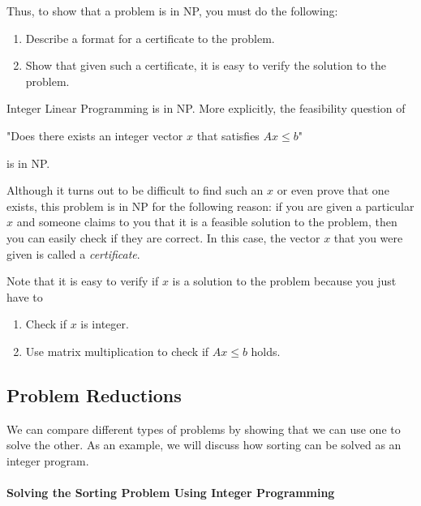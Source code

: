 Thus, to show that a problem is in NP, you must do the following:
\begin{enumerate}
\item Describe a format for a certificate to the problem.
\item Show that given such a certificate, it is easy to verify the solution to the problem.
\end{enumerate}
\begin{example}{}{}
Integer Linear Programming is in NP.  More explicitly, the feasibility question of
\begin{center}
"Does there exists an integer vector $x$ that satisfies $Ax\leq b$"
\end{center}
is in NP.  

Although it turns out to be difficult to find such an $x$ or even prove that one exists, this problem is in NP for the following reason:  if you are given a particular $x$ and someone claims to you that it is a feasible solution to the problem, then you can easily check if they are correct.  
In this case, the vector $x$ that you were given is called a \emph{certificate}.

Note that it is easy to verify if $x$ is a solution to the problem because you just have to 
\begin{enumerate}
\item Check if $x$ is integer.
\item Use matrix multiplication to check if $Ax \leq b$ holds.
\end{enumerate}
\end{example}
\subsection{Problem Reductions}

We can compare different types of problems by showing that we can use one to solve the other.  As an example, we will discuss how sorting can be solved as an integer program.

%
\begin{center}
\end{center}
%

\paragraph{Solving the Sorting Problem Using Integer Programming}

